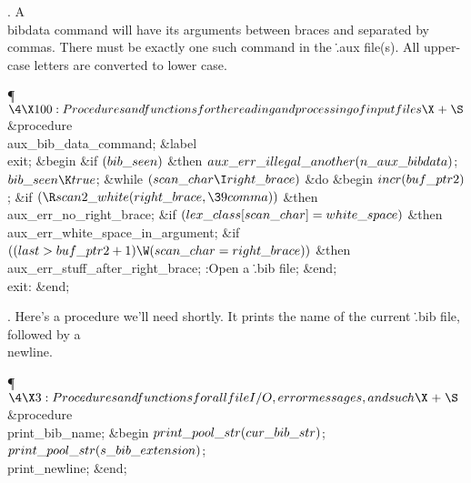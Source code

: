 .
A \.{\\bibdata} command will have its arguments between braces and
separated by commas.  There must be exactly one such command in the
\.{.aux} file(s).  All upper-case letters are converted to lower case.

\Y\P$\4\X100:Procedures and functions for the reading and processing of input
files\X\mathrel{+}\S$\6
\4\&{procedure}\1\  \\{aux\_bib\_data\_command};\6
\4\&{label} \\{exit};\2\6
\&{begin} \&{if} $(\\{bib\_seen})$ \1\&{then}\5
$\\{aux\_err\_illegal\_another}(\\{n\_aux\_bibdata})$;\2\6
$\\{bib\_seen}\K\\{true}$;\6
\&{while} $(\\{scan\_char}\I\\{right\_brace})$ \1\&{do}\6
\&{begin} $\\{incr}(\\{buf\_ptr2})$;\6
\&{if} $(\R\\{scan2\_white}(\\{right\_brace},\39\\{comma}))$ \1\&{then}\5
\\{aux\_err\_no\_right\_brace};\2\6
\&{if} $(\\{lex\_class}[\\{scan\_char}]=\\{white\_space})$ \1\&{then}\5
\\{aux\_err\_white\_space\_in\_argument};\2\6
\&{if} $((\\{last}>\\{buf\_ptr2}+1)\W(\\{scan\_char}=\\{right\_brace}))$ \1%
\&{then}\5
\\{aux\_err\_stuff\_after\_right\_brace};\2\6
:Open a \.{.bib} file\X;\6
\&{end};\2\6
\4\\{exit}: \&{end};\par
\fi

.
Here's a procedure we'll need shortly.  It prints the name of the
current \.{.bib} file, followed by a \\{newline}.

\Y\P$\4\X3:Procedures and functions for all file I/O, error messages, and such%
\X\mathrel{+}\S$\6
\4\&{procedure}\1\  \\{print\_bib\_name};\2\6
\&{begin} $\\{print\_pool\_str}(\\{cur\_bib\_str})$;\5
$\\{print\_pool\_str}(\\{s\_bib\_extension})$;\5
\\{print\_newline};\6
\&{end};\par
\fi

